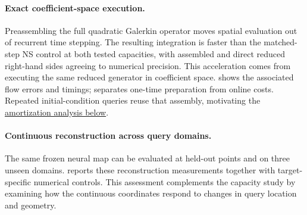 \paragraph{Exact coefficient-space execution.}
\begingroup
Preassembling the full quadratic Galerkin operator moves spatial evaluation out of recurrent time stepping. The resulting integration is faster than the matched-step NS control at both tested capacities, with assembled and direct reduced right-hand sides agreeing to numerical precision. This acceleration comes from executing the same reduced generator in coefficient space.  shows the associated flow errors and timings;  separates one-time preparation from online costs. Repeated initial-condition queries reuse that assembly, motivating the \hyperref[sec:inference-cost]{amortization analysis below}.
\par\endgroup

\paragraph{Continuous reconstruction across query domains.}
{The same frozen neural map can be evaluated at held-out points and on three unseen domains.  reports these reconstruction measurements together with target-specific numerical controls. This assessment complements the capacity study by examining how the continuous coordinates respond to changes in query location and geometry.}





